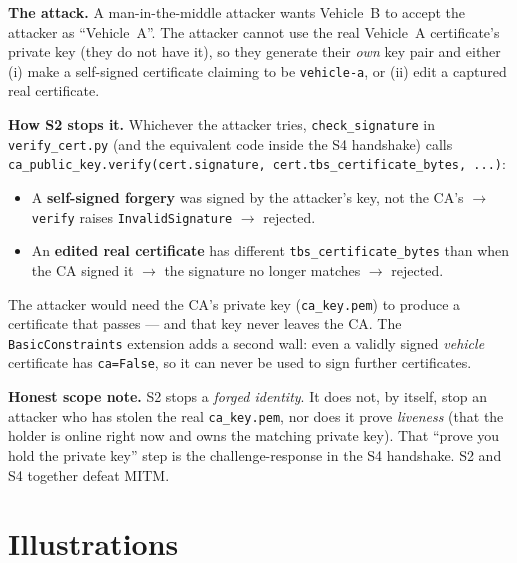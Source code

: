 \documentclass[11pt,a4paper]{report}
\begin{document}
\textbf{The attack.} A man-in-the-middle attacker wants Vehicle~B to accept the
attacker as ``Vehicle~A''. The attacker cannot use the real Vehicle~A
certificate's private key (they do not have it), so they generate their \emph{own}
key pair and either (i) make a self-signed certificate claiming to be
\texttt{vehicle-a}, or (ii) edit a captured real certificate.

\textbf{How S2 stops it.} Whichever the attacker tries, \texttt{check\_signature}
in \texttt{verify\_cert.py} (and the equivalent code inside the S4 handshake)
calls \texttt{ca\_public\_key.verify(cert.signature,
cert.tbs\_certificate\_bytes, ...)}:
\begin{itemize}
  \item A \textbf{self-signed forgery} was signed by the attacker's key, not the
        CA's $\to$ \texttt{verify} raises \texttt{InvalidSignature} $\to$ rejected.
  \item An \textbf{edited real certificate} has different
        \texttt{tbs\_certificate\_bytes} than when the CA signed it $\to$ the
        signature no longer matches $\to$ rejected.
\end{itemize}
The attacker would need the CA's private key (\texttt{ca\_key.pem}) to produce a
certificate that passes --- and that key never leaves the CA. The
\texttt{BasicConstraints} extension adds a second wall: even a validly signed
\emph{vehicle} certificate has \texttt{ca=False}, so it can never be used to sign
further certificates.

\textbf{Honest scope note.} S2 stops a \emph{forged identity}. It does not, by
itself, stop an attacker who has stolen the real \texttt{ca\_key.pem}, nor does
it prove \emph{liveness} (that the holder is online right now and owns the
matching private key). That ``prove you hold the private key'' step is the
challenge-response in the S4 handshake. S2 and S4 together defeat MITM.

\section{Illustrations}
\end{document}

